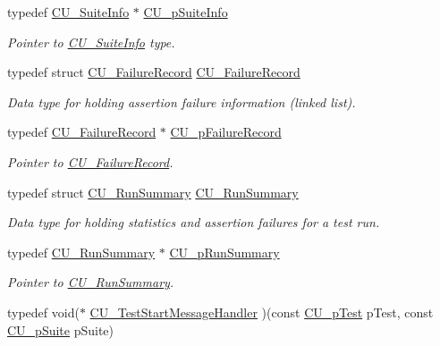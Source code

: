 \begin{DoxyCompactItemize}
typedef \hyperlink{struct_c_u___suite_info}{C\+U\+\_\+\+Suite\+Info} $\ast$ \hyperlink{group___framework_gaf0deaec93829917ef410128e19ab8887}{C\+U\+\_\+p\+Suite\+Info}
\begin{DoxyCompactList}\small\item\em Pointer to \hyperlink{struct_c_u___suite_info}{C\+U\+\_\+\+Suite\+Info} type. \end{DoxyCompactList}\item 
typedef struct \hyperlink{struct_c_u___failure_record}{C\+U\+\_\+\+Failure\+Record} \hyperlink{group___framework_ga5cada0980a95780d4d7c9f2f9b73d8ad}{C\+U\+\_\+\+Failure\+Record}
\begin{DoxyCompactList}\small\item\em Data type for holding assertion failure information (linked list). \end{DoxyCompactList}\item 
typedef \hyperlink{struct_c_u___failure_record}{C\+U\+\_\+\+Failure\+Record} $\ast$ \hyperlink{group___framework_gafe3d04f76bf2fac18a3b6a9fd9368308}{C\+U\+\_\+p\+Failure\+Record}
\begin{DoxyCompactList}\small\item\em Pointer to \hyperlink{struct_c_u___failure_record}{C\+U\+\_\+\+Failure\+Record}. \end{DoxyCompactList}\item 
typedef struct \hyperlink{struct_c_u___run_summary}{C\+U\+\_\+\+Run\+Summary} \hyperlink{group___framework_gaccf591ac5a134c3ba3a1becb7d469094}{C\+U\+\_\+\+Run\+Summary}
\begin{DoxyCompactList}\small\item\em Data type for holding statistics and assertion failures for a test run. \end{DoxyCompactList}\item 
typedef \hyperlink{struct_c_u___run_summary}{C\+U\+\_\+\+Run\+Summary} $\ast$ \hyperlink{group___framework_gad47d258dca538a934dccaeab9392b391}{C\+U\+\_\+p\+Run\+Summary}
\begin{DoxyCompactList}\small\item\em Pointer to \hyperlink{struct_c_u___run_summary}{C\+U\+\_\+\+Run\+Summary}. \end{DoxyCompactList}\item 
typedef void($\ast$ \hyperlink{group___framework_ga3330df7f5c95933f4ba21c648933c928}{C\+U\+\_\+\+Test\+Start\+Message\+Handler} )(const \hyperlink{group___framework_ga249c43fbe4e53452b3f90db1437da04b}{C\+U\+\_\+p\+Test} p\+Test, const \hyperlink{group___framework_gaba832ae8b235f5e70d6a4ac9c3bb1219}{C\+U\+\_\+p\+Suite} p\+Suite)

\end{DoxyCompactItemize}
